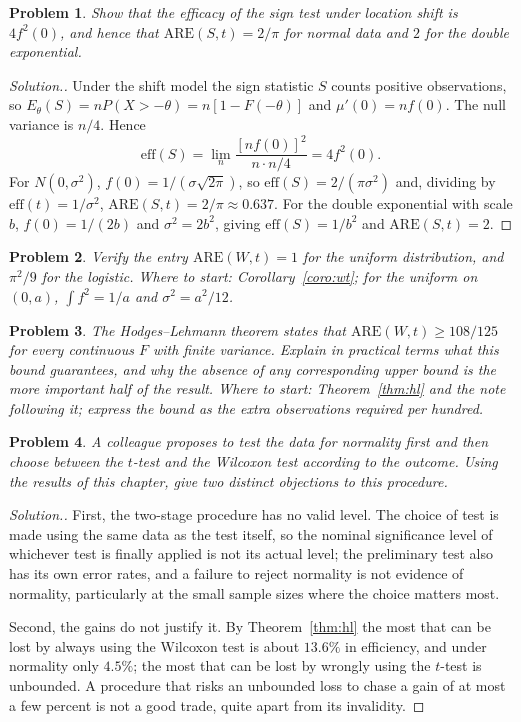 \documentclass[12pt,a4paper]{report}
\theoremstyle{definition}
\theoremstyle{plain}
\newtheorem{problemx}{Problem}[section]
\newenvironment{problem}{\begin{problemx}}{\end{problemx}}
\newenvironment{solution}
  {\renewcommand{\qedsymbol}{}\begin{proof}[\textit{Solution}.]}
  {\end{proof}}
\begin{document}
\begin{problem}
Show that the efficacy of the sign test under location shift is $4f^{2}(0)$, and
hence that $\mathrm{ARE}(S,t)=2/\pi$ for normal data and $2$ for the double
exponential.
\end{problem}

\begin{solution}
Under the shift model the sign statistic $S$ counts positive observations, so
$E_\theta(S)=nP(X>-\theta)=n\left[1-F(-\theta)\right]$ and
$\mu'(0)=nf(0)$. The null variance is $n/4$. Hence
$$\mathrm{eff}(S)=\lim_n\frac{\left[nf(0)\right]^{2}}{n\cdot n/4}=4f^{2}(0).$$
For $N(0,\sigma^{2})$, $f(0)=1/(\sigma\sqrt{2\pi})$, so
$\mathrm{eff}(S)=2/(\pi\sigma^{2})$ and, dividing by
$\mathrm{eff}(t)=1/\sigma^{2}$, $\mathrm{ARE}(S,t)=2/\pi\approx0.637$. For the
double exponential with scale $b$, $f(0)=1/(2b)$ and $\sigma^{2}=2b^{2}$, giving
$\mathrm{eff}(S)=1/b^{2}$ and $\mathrm{ARE}(S,t)=2$.
\end{solution}

\begin{problem}
Verify the entry $\mathrm{ARE}(W,t)=1$ for the uniform distribution, and
$\pi^{2}/9$ for the logistic.
\emph{Where to start: Corollary~\ref{coro:wt}; for the uniform on $(0,a)$, $\int f^2 = 1/a$ and $\sigma^2 = a^2/12$.}
\end{problem}

\begin{problem}
The Hodges--Lehmann theorem states that $\mathrm{ARE}(W,t)\geq 108/125$ for every
continuous $F$ with finite variance. Explain in practical terms what this bound
guarantees, and why the absence of any corresponding upper bound is the more
important half of the result.
\emph{Where to start: Theorem~\ref{thm:hl} and the note following it; express the bound as the extra observations required per hundred.}
\end{problem}

\begin{problem}
A colleague proposes to test the data for normality first and then choose
between the $t$-test and the Wilcoxon test according to the outcome. Using the
results of this chapter, give two distinct objections to this procedure.
\end{problem}

\begin{solution}
First, the two-stage procedure has no valid level. The choice of test is made
using the same data as the test itself, so the nominal significance level of
whichever test is finally applied is not its actual level; the preliminary test
also has its own error rates, and a failure to reject normality is not evidence
of normality, particularly at the small sample sizes where the choice matters
most.

Second, the gains do not justify it. By Theorem~\ref{thm:hl} the most that can
be lost by always using the Wilcoxon test is about $13.6\%$ in efficiency, and
under normality only $4.5\%$; the most that can be lost by wrongly using the
$t$-test is unbounded. A procedure that risks an unbounded loss to chase a gain
of at most a few percent is not a good trade, quite apart from its invalidity.
\end{solution}
\end{document}
